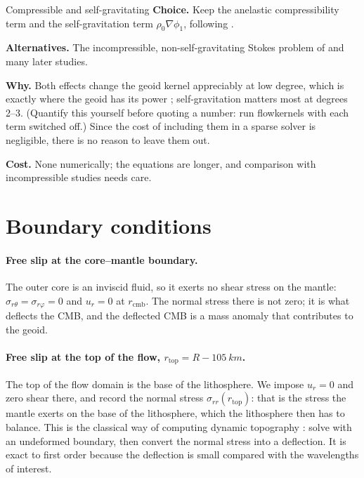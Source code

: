 \begin{decision}{Compressible and self-gravitating}
\textbf{Choice.} Keep the anelastic compressibility term and the self-gravitation term $\rho_0\nabla\phi_1$, following \citet{corrieu_mantle_1995}.

\textbf{Alternatives.} The incompressible, non-self-gravitating Stokes problem of \citet{hager_lower_1985} and many later studies.

\textbf{Why.} Both effects change the geoid kernel appreciably at low degree, which is exactly where the geoid has its power \citep{corrieu_mantle_1995,forte_viscous_1991}; self-gravitation matters most at degrees 2--3.
(Quantify this yourself before quoting a number: run flowkernels with each term switched off.)
Since the cost of including them in a sparse solver is negligible, there is no reason to leave them out.

\textbf{Cost.} None numerically; the equations are longer, and comparison with incompressible studies needs care.
\end{decision}

\section{Boundary conditions}

\paragraph{Free slip at the core--mantle boundary.}
The outer core is an inviscid fluid, so it exerts no shear stress on the mantle: $\sigma_{r\theta}=\sigma_{r\varphi}=0$ and $u_r = 0$ at $r_{\mathrm{cmb}}$.
The normal stress there is not zero; it is what deflects the CMB, and the deflected CMB is a mass anomaly that contributes to the geoid.

\paragraph{Free slip at the top of the flow, $r_{\mathrm{top}} = R - \qty{105}{km}$.}
The top of the flow domain is the base of the lithosphere.
We impose $u_r=0$ and zero shear there, and record the normal stress $\sigma_{rr}(r_{\mathrm{top}})$: that is the stress the mantle exerts on the base of the lithosphere, which the lithosphere then has to balance.
This is the classical way of computing dynamic topography \citep{hager_lower_1985,richards_geoid_1984}: solve with an undeformed boundary, then convert the normal stress into a deflection.
It is exact to first order because the deflection is small compared with the wavelengths of interest.

